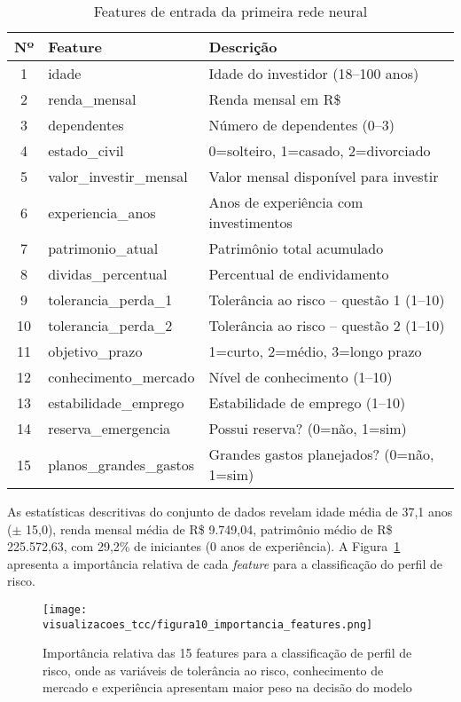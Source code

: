 \begin{table}[htbp]
\centering
\caption{Features de entrada da primeira rede neural}
\label{tab:features_primeira_rede}
\begin{tabular}{@{}clp{6cm}@{}}
\toprule
\textbf{Nº} & \textbf{Feature} & \textbf{Descrição} \\ \midrule
1 & idade & Idade do investidor (18--100 anos) \\
2 & renda\_mensal & Renda mensal em R\$ \\
3 & dependentes & Número de dependentes (0--3) \\
4 & estado\_civil & 0=solteiro, 1=casado, 2=divorciado \\
5 & valor\_investir\_mensal & Valor mensal disponível para investir \\
6 & experiencia\_anos & Anos de experiência com investimentos \\
7 & patrimonio\_atual & Patrimônio total acumulado \\
8 & dividas\_percentual & Percentual de endividamento \\
9 & tolerancia\_perda\_1 & Tolerância ao risco -- questão 1 (1--10) \\
10 & tolerancia\_perda\_2 & Tolerância ao risco -- questão 2 (1--10) \\
11 & objetivo\_prazo & 1=curto, 2=médio, 3=longo prazo \\
12 & conhecimento\_mercado & Nível de conhecimento (1--10) \\
13 & estabilidade\_emprego & Estabilidade de emprego (1--10) \\
14 & reserva\_emergencia & Possui reserva? (0=não, 1=sim) \\
15 & planos\_grandes\_gastos & Grandes gastos planejados? (0=não, 1=sim) \\ \bottomrule
\end{tabular}
\end{table}

As estatísticas descritivas do conjunto de dados revelam idade média de 37,1 anos ($\pm$ 15,0), renda mensal média de R\$ 9.749,04, patrimônio médio de R\$ 225.572,63, com 29,2\% de iniciantes (0 anos de experiência). A Figura~\ref{fig:importancia_features} apresenta a importância relativa de cada \textit{feature} para a classificação do perfil de risco.

\begin{figure}[htbp]
    \centering
    \texttt{[image: visualizacoes\_tcc/figura10\_importancia\_features.png]}
    \caption{Importância relativa das 15 features para a classificação de perfil de risco, onde as variáveis de tolerância ao risco, conhecimento de mercado e experiência apresentam maior peso na decisão do modelo}
    \label{fig:importancia_features}
\end{figure}

